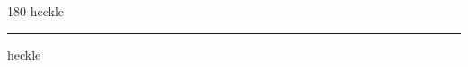 
\begin{frame}
\begin{center}
\begin{turn}{180}
{\fontsize{2.5cm}{1em}\selectfont heckle}
\end{turn}
\vspace{1em}\par  
\hrule
\vspace{1em}\par  
{\fontsize{2.5cm}{1em}\selectfont heckle}
\end{center}
\end{frame}
